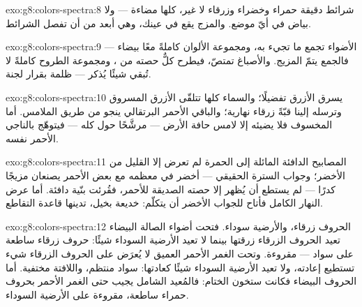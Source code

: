 \begin{solution}{exo:g8:colors-spectra:8}
شرائط دقيقة حمراء وخضراء وزرقاء لا غير، كلها مضاءة --- ولا
بياض في أيّ موضع. والمزج يقع في عينك، وهي أبعد من أن تفصل
الشرائط.
\end{solution}

\begin{solution}{exo:g8:colors-spectra:9}
الأضواء تجمع ما تجيء به، ومجموعة الألوان كاملةً معًا بيضاء ---
فالجمع يتمّ المزيج. والأصباغ تمتصّ، فيطرح كلٌّ حصته من ،
ومجموعة الطروح كاملةً لا تُبقي شيئًا يُذكر --- ظلمة بقرار
لجنة.
\end{solution}

\begin{solution}{exo:g8:colors-spectra:10}
 يسرق الأزرق تفضيلًا؛ والسماء كلها تتلقّى الأزرق المسروق
وترسله إلينا قبّةً زرقاء نهارية؛ والباقي الأحمر البرتقالي ينجو
من طريق  الملامس. أما  المخسوف فلا يضيئه إلا 
لامس حافة الأرض --- مرشَّحًا  حول  كله --- فيتوهّج
بالناجي الأحمر نفسه.
\end{solution}

\begin{solution}{exo:g8:colors-spectra:11}
المصابيح الدافئة المائلة إلى الحمرة لم تعرض إلا القليل من
الأخضر؛ وجواب السترة الحقيقي --- أخضر في معظمه مع بعض الأحمر
يصنعان مزيجًا كدرًا --- لم يستطع أن يُظهر إلا حصته الصديقة
للأحمر، فقُرئت بنّية دافئة. أما عرض  النهار الكامل فأتاح
للجواب الأخضر أن يتكلّم: خديعة  بخيل، تدينها قاعدة
التقاطع.
\end{solution}

\begin{solution}{exo:g8:colors-spectra:12}
الحروف زرقاء، والأرضية سوداء. فتحت أضواء الصالة البيضاء تعيد
الحروف الزرقاء زرقتها بينما لا تعيد الأرضية السوداء شيئًا:
حروف زرقاء ساطعة على سواد --- مقروءة. وتحت الغمر الأحمر العميق
لا يُعرَض على الحروف الزرقاء شيء تستطيع إعادته، ولا تعيد
الأرضية السوداء شيئًا كعادتها: سواد منتظم، واللافتة مختفية.
أما الحروف البيضاء فكانت ستخون الختام: فالمُعيد الشامل يجيب
حتى الغمر الأحمر بحروف حمراء ساطعة، مقروءة على الأرضية
السوداء.
\end{solution}

